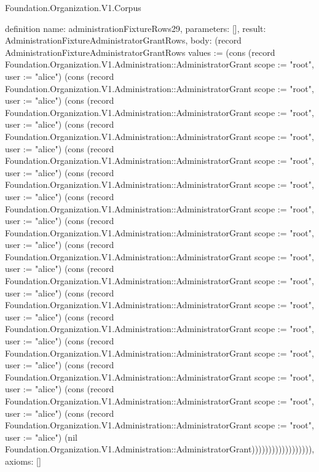\begin{lexlean}{Foundation.Organization.V1.Corpus}
\begin{semanticmodule}
definition{
  name: administrationFixtureRows29,
  parameters: [],
  result: AdministrationFixtureAdministratorGrantRows,
  body: (record AdministrationFixtureAdministratorGrantRows {values := (cons (record Foundation.Organization.V1.Administration::AdministratorGrant {scope := "root", user := "alice"}) (cons (record Foundation.Organization.V1.Administration::AdministratorGrant {scope := "root", user := "alice"}) (cons (record Foundation.Organization.V1.Administration::AdministratorGrant {scope := "root", user := "alice"}) (cons (record Foundation.Organization.V1.Administration::AdministratorGrant {scope := "root", user := "alice"}) (cons (record Foundation.Organization.V1.Administration::AdministratorGrant {scope := "root", user := "alice"}) (cons (record Foundation.Organization.V1.Administration::AdministratorGrant {scope := "root", user := "alice"}) (cons (record Foundation.Organization.V1.Administration::AdministratorGrant {scope := "root", user := "alice"}) (cons (record Foundation.Organization.V1.Administration::AdministratorGrant {scope := "root", user := "alice"}) (cons (record Foundation.Organization.V1.Administration::AdministratorGrant {scope := "root", user := "alice"}) (cons (record Foundation.Organization.V1.Administration::AdministratorGrant {scope := "root", user := "alice"}) (cons (record Foundation.Organization.V1.Administration::AdministratorGrant {scope := "root", user := "alice"}) (cons (record Foundation.Organization.V1.Administration::AdministratorGrant {scope := "root", user := "alice"}) (cons (record Foundation.Organization.V1.Administration::AdministratorGrant {scope := "root", user := "alice"}) (cons (record Foundation.Organization.V1.Administration::AdministratorGrant {scope := "root", user := "alice"}) (cons (record Foundation.Organization.V1.Administration::AdministratorGrant {scope := "root", user := "alice"}) (cons (record Foundation.Organization.V1.Administration::AdministratorGrant {scope := "root", user := "alice"}) (nil Foundation.Organization.V1.Administration::AdministratorGrant)))))))))))))))))}),
  axioms: []
}


\end{semanticmodule}
\end{lexlean}

